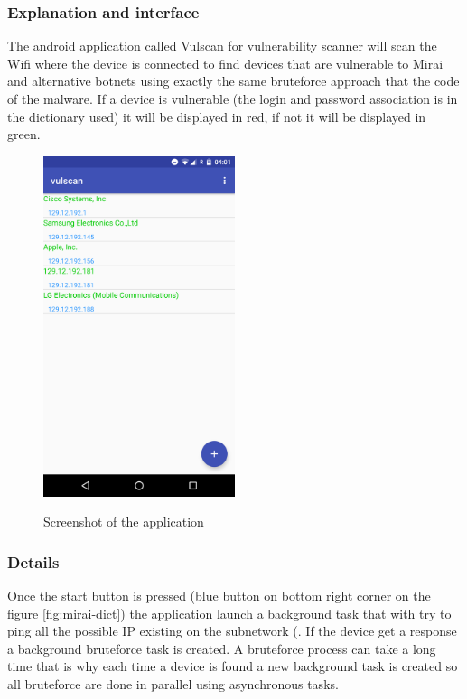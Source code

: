 \documentclass{report}
\begin{document}
\subsubsection{Explanation and interface}
The android application called Vulscan for vulnerability scanner will scan the Wifi where the device is connected to find devices that are vulnerable to Mirai and alternative botnets using exactly the same bruteforce approach that the code of the malware. If a device is vulnerable (the login and password association is in the dictionary used) it will be displayed in red, if not it will be displayed in green.
\begin{figure}[h]
 \caption{Screenshot of the application}
 \centering
 \includegraphics[width=0.5\textwidth]{./img/screen-act}
 \label{fig:screen-act}
\end{figure}

\subsubsection{Details}
Once the start button is pressed (blue button on bottom right corner on the figure \ref{fig:mirai-dict}) the application launch a background task that with try to ping all the possible IP existing on the subnetwork (. If the device get a response a background bruteforce task is created. A bruteforce process can take a long time that is why each time a device is found a new background task is created so all bruteforce are done in parallel using asynchronous tasks.
\end{document}
